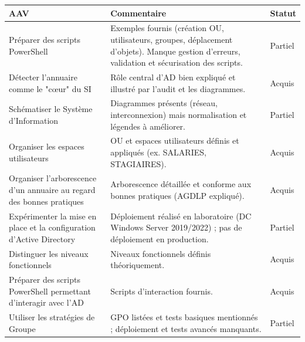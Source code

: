 \begin{center}
\setlength{\tabcolsep}{10pt}

\begin{tabular}{|p{}|p{}|m{}|}
\hline
\textbf{AAV} & \textbf{Commentaire} & \textbf{Statut} \\ \hline

Préparer des scripts PowerShell &
Exemples fournis (création OU, utilisateurs, groupes, déplacement d'objets). Manque gestion d'erreurs, validation et sécurisation des scripts. &
{\color{orange}Partiel} \\ \hline

Détecter l'annuaire comme le "cœur" du SI &
Rôle central d'AD bien expliqué et illustré par l'audit et les diagrammes. &
{\color{green!60!black}Acquis} \\ \hline

Schématiser le Système d'Information &
Diagrammes présents (réseau, interconnexion) mais normalisation et légendes à améliorer. &
{\color{orange}Partiel} \\ \hline

Organiser les espaces utilisateurs &
OU et espaces utilisateurs définis et appliqués (ex. SALARIES, STAGIAIRES). &
{\color{green!60!black}Acquis} \\ \hline

Organiser l'arborescence d'un annuaire au regard des bonnes pratiques &
Arborescence détaillée et conforme aux bonnes pratiques (AGDLP expliqué). &
{\color{green!60!black}Acquis} \\ \hline

Expérimenter la mise en place et la configuration d'Active Directory &
Déploiement réalisé en laboratoire (DC Windows Server 2019/2022) ; pas de déploiement en production. &
{\color{orange}Partiel} \\ \hline

Distinguer les niveaux fonctionnels &
Niveaux fonctionnels définis théoriquement. &
{\color{green!60!black}Acquis} \\ \hline

Préparer des scripts PowerShell permettant d'interagir avec l'AD &
Scripts d'interaction fournis. &
{\color{green!60!black}Acquis} \\ \hline

Utiliser les stratégies de Groupe &
GPO listées et tests basiques mentionnés ; déploiement et tests avancés manquants. &
{\color{orange}Partiel} \\ \hline


\end{tabular}
\end{center}
